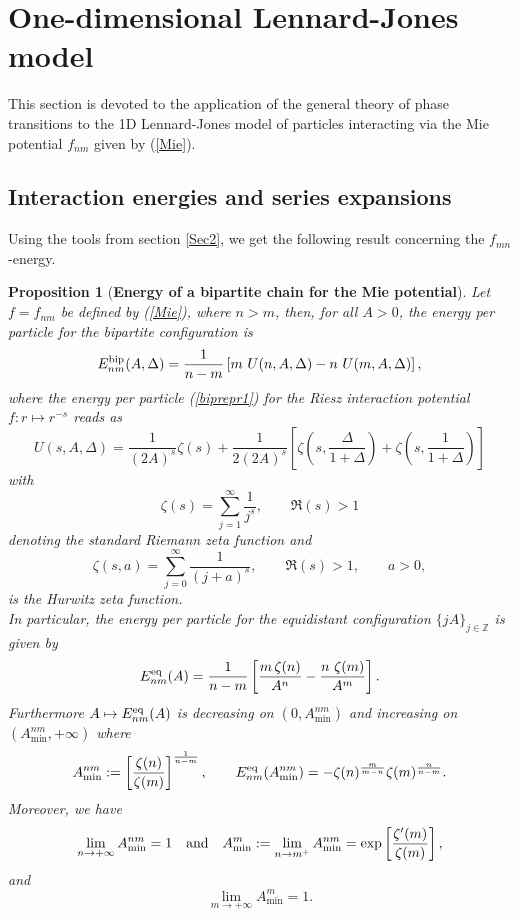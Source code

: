 \documentclass[12pt]{iopart}
\newtheorem{prop}[thm]{Proposition}
\theoremstyle{definition}
\newcommand{\Z}{\mathbb Z}
\begin{document}
\renewcommand{\theequation}{3.\arabic{equation}}
\setcounter{equation}{0}

\section{One-dimensional Lennard-Jones model} \label{Sec3}
This section is devoted to the application of the general theory of phase
transitions to the 1D Lennard-Jones model of particles
interacting via the Mie potential $f_{nm}$ given by (\ref{Mie}).

\subsection{Interaction energies and series expansions}
Using the tools from section \ref{Sec2}, we get the following result
concerning the $f_{mn}$-energy.
\begin{prop}[\textbf{Energy of a bipartite chain for the Mie potential}] \label{prop:enerbipLJ}
Let $f=f_{nm}$ be defined by {\rm (\ref{Mie})}, where $n>m$, then,
for all $A>0$, the energy per particle for the bipartite configuration is
\begin{equation} \label{energyy}
E_{nm}^{\rm bip}(A,\Delta) = \frac{1}{n-m}
\left[ m\ U(n,A,\Delta)-n\ U(m,A,\Delta) \right],
\end{equation}
where the energy per particle {\rm (\ref{biprepr1})} for
the Riesz interaction potential $f:r\mapsto r^{-s}$ reads as
\begin{equation} \label{Riesz}
U(s,A,\Delta) = \frac{1}{(2A)^s} \zeta(s) + \frac{1}{2 (2A)^s}
\left[ \zeta\left( s,\frac{\Delta}{1+\Delta}\right)
+\zeta\left( s,\frac{1}{1+\Delta}\right) \right]
\end{equation}
with 
\begin{equation} \label{RiemannZeta}
\zeta(s) = \sum_{j=1}^{\infty} \frac{1}{j^s} , \qquad \Re(s)>1
\end{equation}
denoting the standard Riemann zeta function and
\begin{equation} \label{HurwitzZeta}
\zeta(s,a) = \sum_{j=0}^{\infty} \frac{1}{(j+a)^s} , \qquad \Re(s)>1,
\qquad a>0,  
\end{equation}
is the Hurwitz zeta function. \\
In particular, the energy per particle for the equidistant configuration
$\{j A\}_{j\in \Z}$ is given by
\begin{equation} \label{energd1}
E_{nm}^{\rm eq}(A) = \frac{1}{n-m} \left[ \frac{m\, \zeta(n)}{A^n}
-\frac{n\ \zeta(m)}{A^m} \right].
\end{equation}
Furthermore $A\mapsto E_{nm}^{\rm eq}(A)$ is decreasing on $(0,A_{\min}^{nm})$
and increasing on $(A_{\min}^{nm},+\infty)$ where
\begin{equation} \label{A}
A^{nm}_{\min} := \left[ \frac{\zeta(n)}{\zeta(m)} \right]^{\frac{1}{n-m}} ,
\qquad E_{nm}^{\rm eq}(A^{nm}_{\min}) = - \zeta(n)^{\frac{m}{m-n}} \zeta(m)^{\frac{n}{n-m}} .
\end{equation}
Moreover, we have
$$
\lim_{n\to +\infty} A^{nm}_{\min}=1 \quad \textnormal{and} \quad 
A^m_{\min} :=\lim_{n\to m^+}  A^{nm}_{\min}  = \exp\left[ \frac{\zeta'(m)}{\zeta(m)} \right],  
$$
and
$$
\lim_{m\to +\infty} A^m_{\min}=1.
$$
\end{prop}
\end{document}
